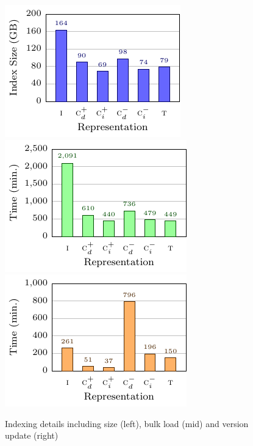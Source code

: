 \documentclass[a4paper]{llncs}
\begin{document}
\begin{figure}[t]
\includegraphics[scale=0.8]{plots/indexsize}
\includegraphics[scale=0.8]{plots/indextime}
\includegraphics[scale=0.8]{plots/updatetime}
\caption{Indexing details including size (left), bulk load (mid) and version update (right) \label{fig:index}}
\end{figure}

%
\end{document}
